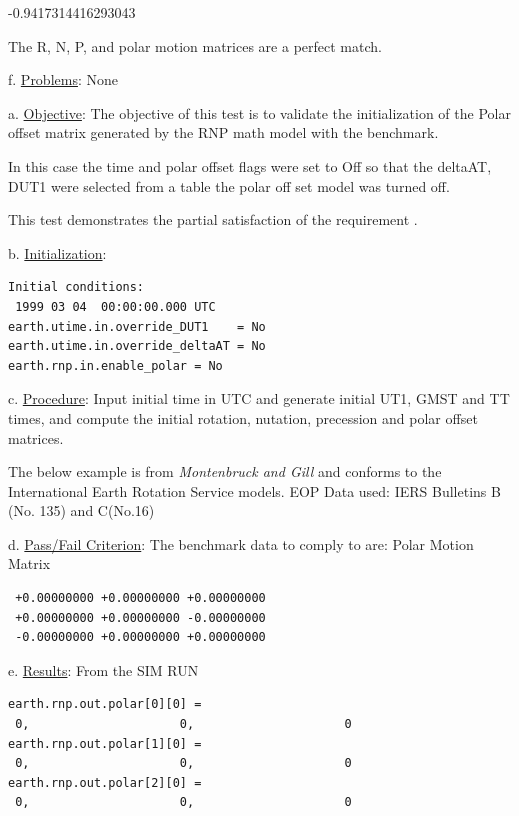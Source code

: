  -0.9417314416293043


The R, N, P, and polar motion matrices are a 
perfect match.\newline

f. \underline{Problems}:\newline
None


     \label{test:rnp_test4}

a. \underline{Objective}:\newline
The objective of this test is to validate the initialization of the Polar 
offset matrix generated by the RNP math model with the benchmark.

In this case the time and polar offset flags were set to Off so that the 
deltaAT, DUT1 were selected from a table the polar off set model was 
turned off.\newline

This test demonstrates the partial satisfaction
of the requirement .

b. \underline{Initialization}:
\begin{verbatim}
Initial conditions:
 1999 03 04  00:00:00.000 UTC
earth.utime.in.override_DUT1    = No
earth.utime.in.override_deltaAT = No
earth.rnp.in.enable_polar = No
\end{verbatim}

c. \underline{Procedure}:\newline
Input initial time in UTC and generate initial UT1, GMST and TT times, 
and compute the initial rotation, nutation, 
precession and polar offset matrices.

The below example is from {\em Montenbruck and Gill} \cite{MG} 
and conforms to the International Earth Rotation Service models.  
EOP Data used: IERS Bulletins B (No. 135) and C(No.16)\newline

d. \underline{Pass/Fail Criterion}:\newline
The benchmark data to comply to are: 
Polar Motion Matrix
\begin{verbatim}
 +0.00000000 +0.00000000 +0.00000000
 +0.00000000 +0.00000000 -0.00000000
 -0.00000000 +0.00000000 +0.00000000
\end{verbatim}

e. \underline{Results}:\newline
From the SIM RUN
\begin{verbatim}
earth.rnp.out.polar[0][0] = 
 0,                     0,                     0 
earth.rnp.out.polar[1][0] = 
 0,                     0,                     0 
earth.rnp.out.polar[2][0] = 
 0,                     0,                     0 
\end{verbatim}

